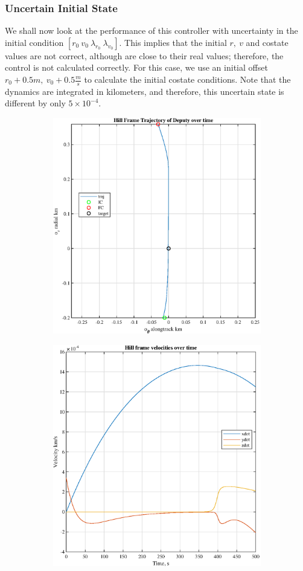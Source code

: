 \documentclass[conf]{new-aiaa}
\begin{document}
\begin{singlespace}
\subsubsection{Uncertain Initial State}
We shall now look at the performance of this controller with uncertainty in the initial condition $[r_0 \ v_0 \ \lambda_{r_0} \ \lambda_{v_0}]$. This implies that the initial $r, \ v$ and costate values are not correct, although are close to their real values; therefore, the control is not calculated correctly. For this case, we use an initial offset $r_0 + 0.5m, \ v_0 + 0.5 \frac{m}{s}$ to calculate the initial costate conditions. Note that the dynamics are integrated in kilometers, and therefore, this uncertain state is different by only $5\times10^{-4}$.
\begin{figure}[htpb!]
\begin{subfigure}{.5\textwidth}
  \centering
  \includegraphics[width=.8\linewidth]{figures/traj_u.eps}
\end{subfigure}%
\begin{subfigure}{.5\textwidth}
  \centering
  \includegraphics[width=.8\linewidth]{figures/vels_u.eps}

\end{subfigure}
\end{figure}
\end{singlespace}
\end{document}
